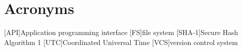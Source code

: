 \chapter*{Acronyms}
\begin{acronym}
    [API]{Application programming interface}
    [FS]{file system}
    [SHA-1]{Secure Hash Algorithm 1}
    [UTC]{Coordinated Universal Time}
    [VCS]{version control system}
\end{acronym}
